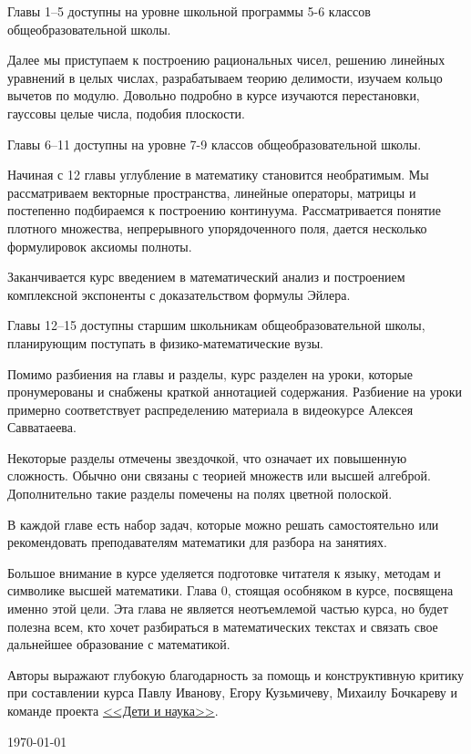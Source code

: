 Главы 1--5 доступны на уровне школьной программы 5-6 классов общеобразовательной школы.

Далее мы приступаем к построению рациональных чисел, решению линейных уравнений в целых числах, разрабатываем теорию делимости, изучаем кольцо вычетов по модулю. Довольно подробно в курсе изучаются перестановки, гауссовы целые числа, подобия плоскости.

Главы 6--11 доступны на уровне 7-9 классов общеобразовательной школы.

Начиная с 12 главы углубление в математику становится необратимым. Мы рассматриваем векторные пространства, линейные операторы, матрицы и постепенно подбираемся к построению континуума. Рассматривается понятие плотного множества, непрерывного упорядоченного поля, дается несколько формулировок аксиомы полноты.

Заканчивается курс введением в математический анализ и построением комплексной экспоненты с доказательством формулы Эйлера.

Главы 12--15 доступны старшим школьникам общеобразовательной школы, планирующим поступать в физико-математические вузы.


Помимо разбиения на главы и разделы, курс разделен на уроки, которые пронумерованы и снабжены краткой аннотацией содержания. Разбиение на уроки примерно соответствует распределению материала в видеокурсе Алексея Савватаеева.

Некоторые разделы отмечены звездочкой, что означает их повышенную сложность. Обычно они связаны с теорией множеств или высшей алгеброй. Дополнительно такие разделы помечены на полях цветной полоской.

В каждой главе есть набор задач, которые можно решать самостоятельно или рекомендовать преподавателям математики для разбора на занятиях. 

Большое внимание в курсе уделяется подготовке читателя к языку, методам и символике высшей математики. Глава 0, стоящая особняком в курсе, посвящена именно этой цели. Эта глава не является неотъемлемой частью курса, но будет полезна всем, кто хочет разбираться в математических текстах и связать свое дальнейшее образование с математикой.

Авторы выражают глубокую благодарность за помощь и конструктивную критику при составлении курса Павлу Иванову, Егору Кузьмичеву, Михаилу Бочкареву и команде проекта \href{http://childrenscience.ru/}{<<Дети и наука>>}.

\quad

\quad \hfill \today



